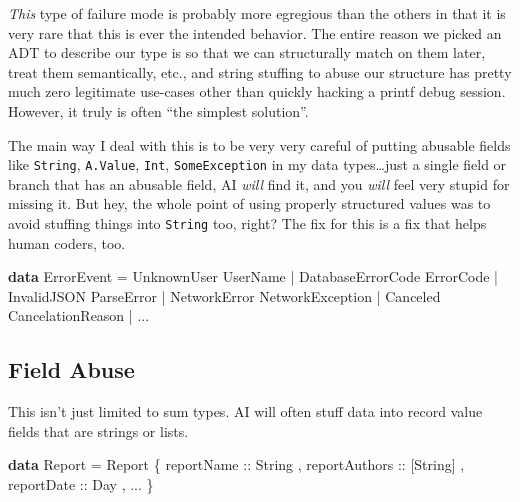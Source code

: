 \documentclass[]{article}
\newenvironment{Shaded}{}{}
\newcommand{\DataTypeTok}[1]{\textcolor[rgb]{0.56,0.13,0.00}{#1}}
\newcommand{\KeywordTok}[1]{\textcolor[rgb]{0.00,0.44,0.13}{\textbf{#1}}}
\newcommand{\NormalTok}[1]{#1}
\newcommand{\OperatorTok}[1]{\textcolor[rgb]{0.40,0.40,0.40}{#1}}
\newcommand{\OtherTok}[1]{\textcolor[rgb]{0.00,0.44,0.13}{#1}}
\begin{document}
\emph{This} type of failure mode is probably more egregious than the others in
that it is very rare that this is ever the intended behavior. The entire reason
we picked an ADT to describe our type is so that we can structurally match on
them later, treat them semantically, etc., and string stuffing to abuse our
structure has pretty much zero legitimate use-cases other than quickly hacking a
printf debug session. However, it truly is often {``the simplest solution''}.

The main way I deal with this is to be very very careful of putting abusable
fields like \texttt{String}, \texttt{A.Value}, \texttt{Int},
\texttt{SomeException} in my data types\ldots just a single field or branch that
has an abusable field, AI \emph{will} find it, and you \emph{will} feel very
stupid for missing it. But hey, the whole point of using properly structured
values was to avoid stuffing things into \texttt{String} too, right? The fix for
this is a fix that helps human coders, too.

\begin{Shaded}
\begin{Highlighting}[]
\KeywordTok{data} \DataTypeTok{ErrorEvent} \OtherTok{=} \DataTypeTok{UnknownUser} \DataTypeTok{UserName}
                \OperatorTok{|} \DataTypeTok{DatabaseErrorCode} \DataTypeTok{ErrorCode}
                \OperatorTok{|} \DataTypeTok{InvalidJSON} \DataTypeTok{ParseError}
                \OperatorTok{|} \DataTypeTok{NetworkError} \DataTypeTok{NetworkException}
                \OperatorTok{|} \DataTypeTok{Canceled} \DataTypeTok{CancelationReason}
                \OperatorTok{|} \OperatorTok{...}
\end{Highlighting}
\end{Shaded}

\subsection{Field Abuse}\label{field-abuse}

This isn't just limited to sum types. AI will often stuff data into record value
fields that are strings or lists.

\begin{Shaded}
\begin{Highlighting}[]
\KeywordTok{data} \DataTypeTok{Report} \OtherTok{=} \DataTypeTok{Report}
\NormalTok{    \{}\OtherTok{ reportName ::} \DataTypeTok{String}
\NormalTok{    ,}\OtherTok{ reportAuthors ::}\NormalTok{ [}\DataTypeTok{String}\NormalTok{]}
\NormalTok{    ,}\OtherTok{ reportDate ::} \DataTypeTok{Day}
\NormalTok{    , }\OperatorTok{...}
\NormalTok{    \}}
\end{Highlighting}
\end{Shaded}
\end{document}
